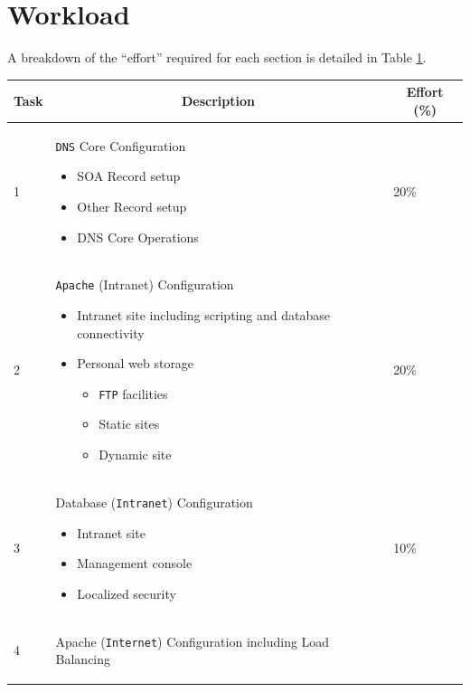 \documentclass[11pt]{article}
\begin{document}
\section{Workload}
A breakdown of the ``effort'' required for each section is detailed in Table \ref{workload}.

\begin{table}[ht]\label{workload}
    \begin{tabular}{|p{1cm}|p{14cm}|p{1cm}|} 
      \hline
      \multicolumn{1}{|c|}{Task} & \multicolumn{1}{|c|}{Description} & \multicolumn{1}{|c|}{Effort (\%)}\\ 
      \hline
      1 & \texttt{DNS} Core Configuration 
            \begin{itemize}
                \item SOA Record setup
                \item Other Record setup
                \item DNS Core Operations 
            \end{itemize}
        & 20\%\\
      \hline
      2 & \texttt{Apache} (Intranet) Configuration
            \begin{itemize}
                \item Intranet site including scripting and database connectivity
                \item Personal web storage
                    \begin{itemize}
                        \item \texttt{FTP} facilities
                        \item Static sites
                        \item Dynamic site
                    \end{itemize}
            \end{itemize} 
        & 20\%\\
      \hline
      3 & Database (\texttt{Intranet}) Configuration
            \begin{itemize}
              \item Intranet site
              \item Management console
              \item Localized security    
            \end{itemize}
      & 10\%\\
      \hline
      4 & Apache (\texttt{Internet}) Configuration including Load Balancing
            \begin{itemize}

\end{itemize}
\end{tabular}
\end{table}
\end{document}
